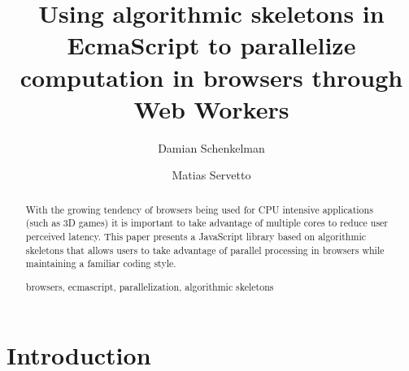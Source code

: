 \documentclass[runningheads,a4paper]{llncs}
\newcommand{\keywords}[1]{\par\addvspace\baselineskip
\noindent\keywordname\enspace\ignorespaces#1}
\begin{document}
\mainmatter  %

\title{Using algorithmic skeletons in EcmaScript to parallelize computation in browsers through Web Workers}


%
%
\author{Damian Schenkelman\and Matias Servetto}
%


%
%

\maketitle


\begin{abstract}
With the growing tendency of browsers being used for CPU intensive applications (such as 3D games) it is important to take advantage of multiple cores to reduce user perceived latency. This paper presents a JavaScript library based on algorithmic skeletons that allows users to take advantage of parallel processing in browsers while maintaining a familiar coding style.
\keywords{browsers, ecmascript, parallelization, algorithmic skeletons}
\end{abstract}

\section{Introduction}
\end{document}
